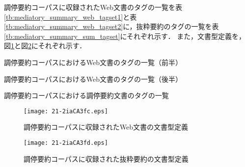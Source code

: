 \documentclass[japanese]{jnlp_1.4}
\begin{document}
調停要約コーパスに収録されたWeb文書のタグの一覧を表\ref{tb:mediatory_summary_web_tagset1}と表\ref{tb:mediatory_summary_web_tagset2}に，抜粋要約のタグの一覧を表\ref{tb:mediatory_summary_sum_tagset}にそれぞれ示す．
また，文書型定義を，図\ref{fg:mediatory_summary_web_dtd}と図\ref{fg:mediatory_summary_sum_dtd}にそれぞれ示す．

\begin{table}[h]
 \caption{調停要約コーパスにおけるWeb文書のタグの一覧（前半）}
 \label{tb:mediatory_summary_web_tagset1}

\end{table}

\clearpage
\begin{table}[p]
 \caption{調停要約コーパスにおけるWeb文書のタグの一覧（後半）}
 \label{tb:mediatory_summary_web_tagset2}

\end{table}


\clearpage
\begin{table}[p]
 \caption{調停要約コーパスにおける調停要約文書のタグの一覧}
 \label{tb:mediatory_summary_sum_tagset}

\end{table}

\clearpage
\begin{figure}[p]
\begin{center}
\texttt{[image: 21-2iaCA3fc.eps]}
\end{center}
 \caption{調停要約コーパスに収録されたWeb文書の文書型定義}
 \label{fg:mediatory_summary_web_dtd}
\end{figure}

\clearpage
\begin{figure}[p]
\begin{center}
\texttt{[image: 21-2iaCA3fd.eps]}
\end{center}
 \caption{調停要約コーパスに収録された抜粋要約の文書型定義}
 \label{fg:mediatory_summary_sum_dtd}
\end{figure}
\end{document}
